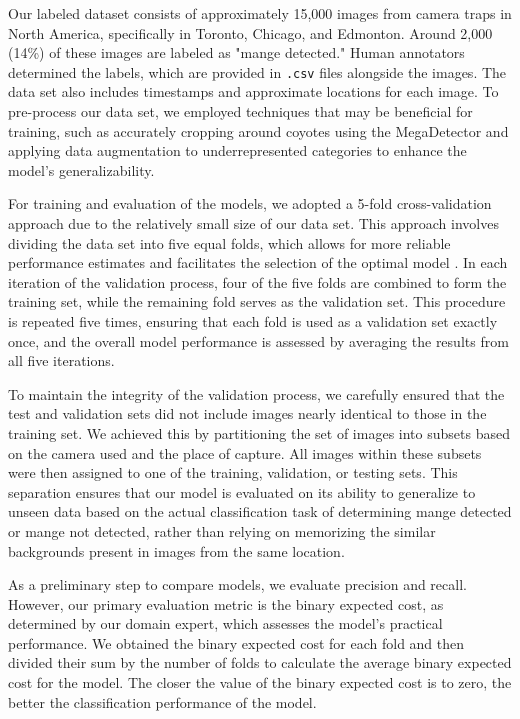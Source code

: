 \documentclass{article}
\begin{document}
Our labeled dataset consists of approximately 15,000 images from camera traps in North America, specifically in Toronto, Chicago, and Edmonton. Around 2,000 (14\%) of these images are labeled as "mange detected." Human annotators determined the labels, which are provided in \verb|.csv| files alongside the images. The data set also includes timestamps and approximate locations for each image. To pre-process our data set, we employed techniques that may be beneficial for training, such as accurately cropping around coyotes using the MegaDetector and applying data augmentation to underrepresented categories to enhance the model's generalizability.

For training and evaluation of the models, we adopted a 5-fold cross-validation approach due to the relatively small size of our data set. This approach involves dividing the data set into five equal folds, which allows for more reliable performance estimates and facilitates the selection of the optimal model \cite{Berrar2019, Schaffer1993}. In each iteration of the validation process, four of the five folds are combined to form the training set, while the remaining fold serves as the validation set. This procedure is repeated five times, ensuring that each fold is used as a validation set exactly once, and the overall model performance is assessed by averaging the results from all five iterations.

To maintain the integrity of the validation process, we carefully ensured that the test and validation sets did not include images nearly identical to those in the training set. We achieved this by partitioning the set of images into subsets based on the camera used and the place of capture. All images within these subsets were then assigned to one of the training, validation, or testing sets. This separation ensures that our model is evaluated on its ability to generalize to unseen data based on the actual classification task of determining mange detected or mange not detected, rather than relying on memorizing the similar backgrounds present in images from the same location.

As a preliminary step to compare models, we evaluate precision and recall. However, our primary evaluation metric is the binary expected cost, as determined by our domain expert, which assesses the model's practical performance. We obtained the binary expected cost for each fold and then divided their sum by the number of folds to calculate the average binary expected cost for the model. The closer the value of the binary expected cost is to zero, the better the classification performance of the model.
\end{document}

